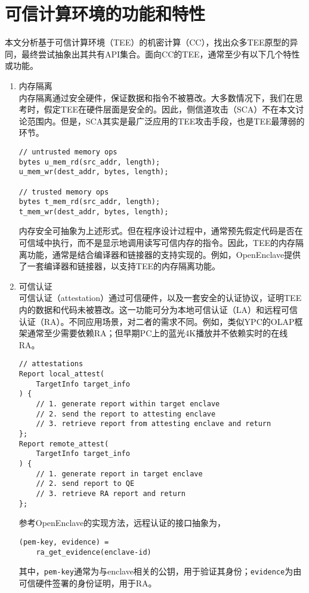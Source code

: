 \chapter{可信计算环境的功能和特性}

本文分析基于可信计算环境（TEE）的机密计算（CC），找出众多TEE原型的异同，最终尝试抽象出其共有API集合。面向CC的TEE，通常至少有以下几个特性或功能。

\begin{enumerate}
    \item 内存隔离\\
    内存隔离通过安全硬件，保证数据和指令不被篡改。大多数情况下，我们在思考时，假定TEE在硬件层面是安全的。因此，侧信道攻击（SCA）不在本文讨论范围内。但是，SCA其实是最广泛应用的TEE攻击手段，也是TEE最薄弱的环节。

    \begin{lstlisting}
// untrusted memory ops 
bytes u_mem_rd(src_addr, length); 
u_mem_wr(dest_addr, bytes, length); 
        
// trusted memory ops
bytes t_mem_rd(src_addr, length);
t_mem_wr(dest_addr, bytes, length);         
    \end{lstlisting}

    内存安全可抽象为上述形式。但在程序设计过程中，通常预先假定代码是否在可信域中执行，而不是显示地调用读写可信内存的指令。因此，TEE的内存隔离功能，通常是结合编译器和链接器的支持实现的。例如，OpenEnclave提供了一套编译器和链接器，以支持TEE的内存隔离功能。

    \item 可信认证\\
    可信认证（attestation）通过可信硬件，以及一套安全的认证协议，证明TEE内的数据和代码未被篡改。这一功能可分为本地可信认证（LA）和远程可信认证（RA）。不同应用场景，对二者的需求不同。例如，类似YPC的OLAP框架通常至少需要依赖RA；但早期PC上的蓝光4K播放并不依赖实时的在线RA。

    \begin{lstlisting}
// attestations 
Report local_attest(
    TargetInfo target_info
) {
    // 1. generate report within target enclave
    // 2. send the report to attesting enclave
    // 3. retrieve report from attesting enclave and return 
}; 
Report remote_attest(
    TargetInfo target_info
) {
    // 1. generate report in target enclave
    // 2. send report to QE
    // 3. retrieve RA report and return
};   
    \end{lstlisting}

    参考OpenEnclave的实现方法，远程认证的接口抽象为，
    \begin{lstlisting}
(pem-key, evidence) = 
    ra_get_evidence(enclave-id)
    \end{lstlisting}
    其中，\texttt{pem-key}通常为与enclave相关的公钥，用于验证其身份；\texttt{evidence}为由可信硬件签署的身份证明，用于RA。


\end{enumerate}
